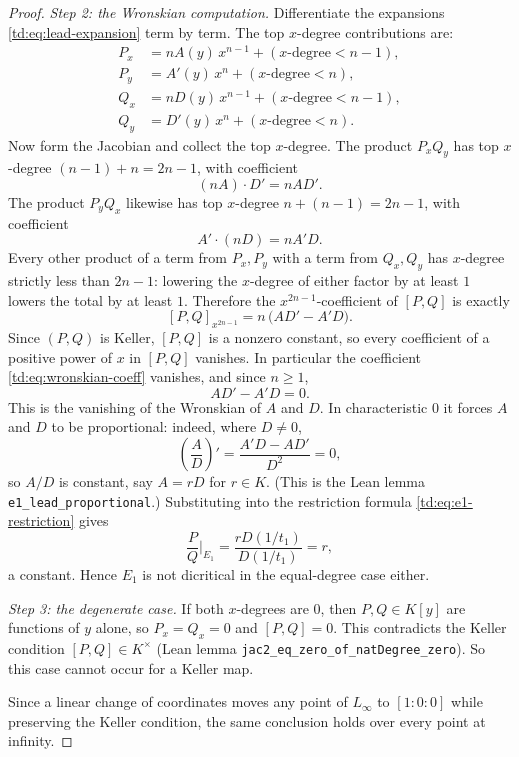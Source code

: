 \documentclass[a4paper,11pt]{article}
\theoremstyle{plain}
\theoremstyle{definition}
\theoremstyle{remark}
\begin{document}
\begin{proof}
\emph{Step 2: the Wronskian computation.} Differentiate the expansions
\eqref{td:eq:lead-expansion} term by term. The top $x$-degree contributions are:
\begin{align}
P_x &= n A(y)\, x^{n-1} + (\text{$x$-degree} < n-1), \\
P_y &= A'(y)\, x^{n} + (\text{$x$-degree} < n), \\
Q_x &= n D(y)\, x^{n-1} + (\text{$x$-degree} < n-1), \\
Q_y &= D'(y)\, x^{n} + (\text{$x$-degree} < n).
\end{align}
Now form the Jacobian and collect the top $x$-degree. The product $P_x Q_y$ has top
$x$-degree $(n-1) + n = 2n - 1$, with coefficient
\[
(n A) \cdot D' = n A D'.
\]
The product $P_y Q_x$ likewise has top $x$-degree $n + (n-1) = 2n - 1$, with coefficient
\[
A' \cdot (n D) = n A' D.
\]
Every other product of a term from $P_x, P_y$ with a term from $Q_x, Q_y$ has $x$-degree
strictly less than $2n - 1$: lowering the $x$-degree of either factor by at least $1$ lowers
the total by at least $1$. Therefore the $x^{2n-1}$-coefficient of $[P,Q]$ is exactly
\begin{equation}\label{td:eq:wronskian-coeff}
[P,Q]_{x^{2n-1}} = n\,\big(A D' - A' D\big).
\end{equation}
Since $(P,Q)$ is Keller, $[P,Q]$ is a nonzero constant, so every coefficient of a positive
power of $x$ in $[P,Q]$ vanishes. In particular the coefficient \eqref{td:eq:wronskian-coeff}
vanishes, and since $n \geq 1$,
\[
A D' - A' D = 0.
\]
This is the vanishing of the Wronskian of $A$ and $D$. In characteristic $0$ it forces $A$
and $D$ to be proportional: indeed, where $D \neq 0$,
\[
\left(\frac{A}{D}\right)' = \frac{A' D - A D'}{D^2} = 0,
\]
so $A/D$ is constant, say $A = r D$ for $r \in K$. (This is the Lean lemma
\texttt{e1\_lead\_proportional}.) Substituting into the restriction formula
\eqref{td:eq:e1-restriction} gives
\[
\frac{P}{Q}\bigg|_{E_1} = \frac{r D(1/t_1)}{D(1/t_1)} = r,
\]
a constant. Hence $E_1$ is not dicritical in the equal-degree case either.

\emph{Step 3: the degenerate case.} If both $x$-degrees are $0$, then $P, Q \in K[y]$ are
functions of $y$ alone, so $P_x = Q_x = 0$ and $[P,Q] = 0$. This contradicts the Keller
condition $[P,Q] \in K^\times$ (Lean lemma \texttt{jac2\_eq\_zero\_of\_natDegree\_zero}). So
this case cannot occur for a Keller map.

Since a linear change of coordinates moves any point of $L_\infty$ to $[1:0:0]$ while
preserving the Keller condition, the same conclusion holds over every point at infinity.
\end{proof}
\end{document}
